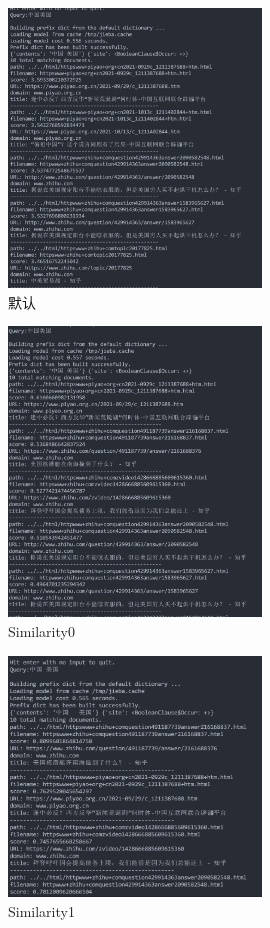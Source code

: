 \documentclass[12pt,a4paper]{article}
\begin{document}
\begin{figure}[H]
	\includegraphics[width=0.6\textwidth]{1_-1.png}
	\centering
	 \caption{默认}
\end{figure}
\begin{figure}[H]
	\includegraphics[width=0.6\textwidth]{1_0.png}
	\centering
	 \caption{Similarity0}
\end{figure}
\begin{figure}[H]
	\includegraphics[width=0.6\textwidth]{1_1.png}
	\centering
	 \caption{Similarity1}
\end{figure}
\end{document}
